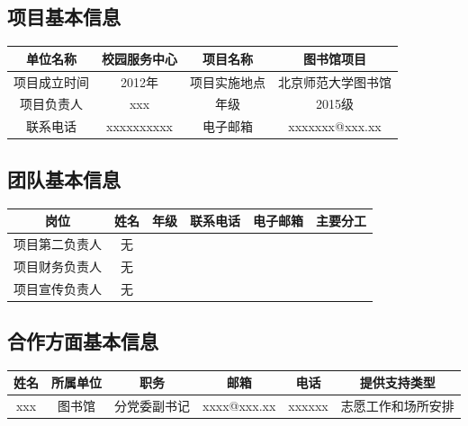 \documentclass[nocover]{lizhechen}
\begin{document}
	\subsection{项目基本信息}
	
	\begin{table}[H]
		\begin{center}
		\begin{tabular}{|c|c|c|c|}
			\hline
			单位名称 & 校园服务中心 & 项目名称 &  图书馆项目 \\
			\hline
			项目成立时间 & 2012年 & 项目实施地点 & 北京师范大学图书馆 \\
			\hline
			项目负责人 & xxx & 年级 & 2015级 \\
			\hline
			联系电话 & xxxxxxxxxx & 电子邮箱 & xxxxxxx@xxx.xx \\
			\hline
		\end{tabular}
		\end{center}
	\end{table}
	
	\subsection{团队基本信息}
	
	\begin{table}[H]
		\begin{center}
			\begin{tabular}{|c|c|c|c|c|c|}
				\hline
				岗位 & 姓名 & 年级 & 联系电话 & 电子邮箱 & 主要分工\\
				\hline
				项目第二负责人 & 无 & \ & \ & \ & \ \\
				\hline
				项目财务负责人 & 无 & \ & \ & \ & \ \\
				\hline
				项目宣传负责人 & 无 & \ & \ & \ & \ \\
				\hline
				
			\end{tabular}
		\end{center}
	\end{table}
	
	\subsection{合作方面基本信息}
	\begin{table}[H]
		\begin{center}
			\begin{tabular}{|c|c|c|c|c|c|}
				\hline
				姓名 & 所属单位 & 职务 & 邮箱 & 电话 & 提供支持类型 \\
				\hline
				xxx & 图书馆 & 分党委副书记 & xxxx@xxx.xx & xxxxxx & 志愿工作和场所安排 \\
				\hline
			\end{tabular}
		\end{center}
	\end{table}
	
\end{document}
